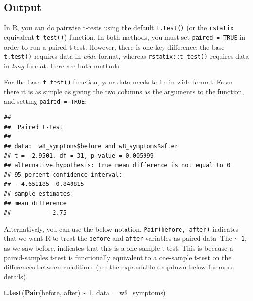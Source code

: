 \documentclass[
]{book}
\newenvironment{Shaded}{\begin{snugshade}}{\end{snugshade}}
\newcommand{\AttributeTok}[1]{\textcolor[rgb]{0.13,0.29,0.53}{#1}}
\newcommand{\ConstantTok}[1]{\textcolor[rgb]{0.56,0.35,0.01}{#1}}
\newcommand{\DecValTok}[1]{\textcolor[rgb]{0.00,0.00,0.81}{#1}}
\newcommand{\FunctionTok}[1]{\textcolor[rgb]{0.13,0.29,0.53}{\textbf{#1}}}
\newcommand{\NormalTok}[1]{#1}
\newcommand{\SpecialCharTok}[1]{\textcolor[rgb]{0.81,0.36,0.00}{\textbf{#1}}}
\begin{document}
\subsection{Output}\label{output-4}

In R, you can do pairwise t-tests using the default \texttt{t.test()} (or the \texttt{rstatix} equivalent \texttt{t\_test()}) function. In both methods, you must set \texttt{paired\ =\ TRUE} in order to run a paired t-test. However, there is one key difference: the base \texttt{t.test()} requires data in \emph{wide} format, whereas \texttt{rstatix::t\_test()} requires data in \emph{long} format. Here are both methods.

For the base \texttt{t.test()} function, your data needs to be in wide format. From there it is as simple as giving the two columns as the arguments to the function, and setting \texttt{paired\ =\ TRUE}:

\begin{Shaded}
\end{Shaded}

\begin{verbatim}
## 
##  Paired t-test
## 
## data:  w8_symptoms$before and w8_symptoms$after
## t = -2.9501, df = 31, p-value = 0.005999
## alternative hypothesis: true mean difference is not equal to 0
## 95 percent confidence interval:
##  -4.651185 -0.848815
## sample estimates:
## mean difference 
##           -2.75
\end{verbatim}

Alternatively, you can use the below notation. \texttt{Pair(before,\ after)} indicates that we want R to treat the \texttt{before} and \texttt{after} variables as paired data. The \texttt{\textasciitilde{}\ 1}, as we saw before, indicates that this is a one-sample t-test. This is because a paired-samples t-test is functionally equivalent to a one-sample t-test on the differences between conditions (see the expandable dropdown below for more details).

\begin{Shaded}
\begin{Highlighting}[]
\FunctionTok{t.test}\NormalTok{(}\FunctionTok{Pair}\NormalTok{(before, after) }\SpecialCharTok{\textasciitilde{}} \DecValTok{1}\NormalTok{, }\AttributeTok{data =}\NormalTok{ w8\_symptoms)}
\end{Highlighting}
\end{Shaded}
\end{document}
